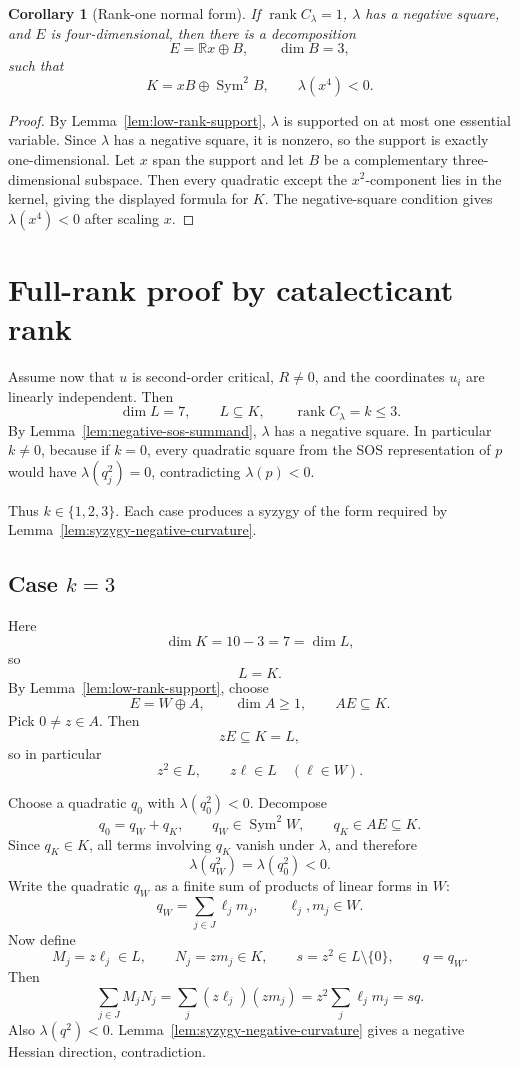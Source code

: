 \documentclass[11pt]{article}
\newtheorem{corollary}[theorem]{Corollary}
\newcommand{\R}{\mathbb R}
\newcommand{\rank}{\operatorname{rank}}
\newcommand{\Sym}{\operatorname{Sym}}
\begin{document}
\begin{corollary}[Rank-one normal form]\label{cor:rank-one-normal-form}
If \(\rank C_\lambda=1\), \(\lambda\) has a negative square, and \(E\) is four-dimensional, then there is a decomposition
\[
E=\R x\oplus B,
\qquad \dim B=3,
\]
such that
\[
K=xB\oplus\Sym^2B,
\qquad
\lambda(x^4)<0.
\]
\end{corollary}

\begin{proof}
By Lemma~\ref{lem:low-rank-support}, \(\lambda\) is supported on at most one essential variable.  Since \(\lambda\) has a negative square, it is nonzero, so the support is exactly one-dimensional.  Let \(x\) span the support and let \(B\) be a complementary three-dimensional subspace.  Then every quadratic except the \(x^2\)-component lies in the kernel, giving the displayed formula for \(K\).  The negative-square condition gives \(\lambda(x^4)<0\) after scaling \(x\).
\end{proof}

\section{Full-rank proof by catalecticant rank}

Assume now that \(u\) is second-order critical, \(R\ne0\), and the coordinates \(u_i\) are linearly independent.  Then
\[
\dim L=7,
\qquad
L\subseteq K,
\qquad
\rank C_\lambda=k\le3.
\]
By Lemma~\ref{lem:negative-sos-summand}, \(\lambda\) has a negative square.  In particular \(k\ne0\), because if \(k=0\), every quadratic square from the SOS representation of \(p\) would have \(\lambda(q_j^2)=0\), contradicting \(\lambda(p)<0\).

Thus \(k\in\{1,2,3\}\).  Each case produces a syzygy of the form required by Lemma~\ref{lem:syzygy-negative-curvature}.

\subsection{Case \(k=3\)}

Here
\[
\dim K=10-3=7=\dim L,
\]
so
\[
L=K.
\]
By Lemma~\ref{lem:low-rank-support}, choose
\[
E=W\oplus A,
\qquad
\dim A\ge1,
\qquad
AE\subseteq K.
\]
Pick \(0\ne z\in A\).  Then
\[
zE\subseteq K=L,
\]
so in particular
\[
z^2\in L,
\qquad
z\ell\in L\quad(\ell\in W).
\]

Choose a quadratic \(q_0\) with \(\lambda(q_0^2)<0\).  Decompose
\[
q_0=q_W+q_K,
\qquad
q_W\in\Sym^2W,
\qquad
q_K\in AE\subseteq K.
\]
Since \(q_K\in K\), all terms involving \(q_K\) vanish under \(\lambda\), and therefore
\[
\lambda(q_W^2)=\lambda(q_0^2)<0.
\]
Write the quadratic \(q_W\) as a finite sum of products of linear forms in \(W\):
\[
q_W=\sum_{j\in J}\ell_jm_j,
\qquad
\ell_j,m_j\in W.
\]
Now define
\[
M_j=z\ell_j\in L,
\qquad
N_j=zm_j\in K,
\qquad
s=z^2\in L\setminus\{0\},
\qquad
q=q_W.
\]
Then
\[
\sum_{j\in J}M_jN_j
=\sum_j(z\ell_j)(zm_j)
=z^2\sum_j\ell_jm_j
=sq.
\]
Also \(\lambda(q^2)<0\).  Lemma~\ref{lem:syzygy-negative-curvature} gives a negative Hessian direction, contradiction.
\end{document}
